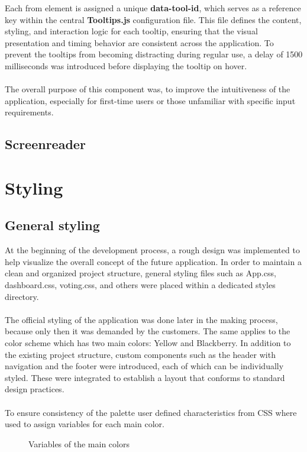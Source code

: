 \documentclass[a4paper,12pt]{report}
\begin{document}
Each from element is assigned a unique \textbf{data-tool-id}, which serves as a reference key within the central \textbf{Tooltips.js} configuration file. This file defines the content, styling, and interaction logic for each tooltip, ensuring that the visual presentation and timing behavior are consistent across the application. To prevent the tooltips from becoming distracting during regular use, a delay of 1500 milliseconds was introduced before displaying the tooltip on hover.\\\\


The overall purpose of this component was, to improve the intuitiveness of the application, especially for first-time users or those unfamiliar with specific input requirements.
\subsection{Screenreader}
\section{Styling}
\subsection{General styling}
At the beginning of the development process, a rough design was implemented to help visualize the overall concept of the future application. In order to maintain a clean and organized project structure, general styling files such as App.css, dashboard.css, voting.css, and others were placed within a dedicated styles directory.\\\\
The official styling of the application was done later in the making process, because only then it was demanded by the customers. The same applies to the color scheme which has two main colors: Yellow and Blackberry. In addition to the existing project structure, custom components such as the header with navigation and the footer were introduced, each of which can be individually styled. These were integrated to establish a layout that conforms to standard design practices.\\\\
To ensure consistency of the palette user defined characteristics from CSS where used to assign variables for each main color. \parencite{csscolorvariables}
\begin{figure}[h!]
	\caption{Variables of the main colors}
	\label{fig:user_defined_characteristics}
\end{figure}
\end{document}
